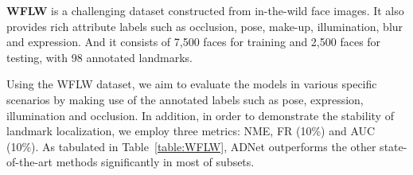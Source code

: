 \documentclass[10pt,twocolumn,letterpaper]{article}
\begin{document}
\vspace{5pt}
\noindent\textbf{WFLW} \cite{wu2018look} is a challenging dataset constructed from in-the-wild face images. It also provides rich attribute labels such as occlusion, pose, make-up, illumination, blur and expression. And it consists of 7,500 faces for training and 2,500 faces for testing, with 98 annotated landmarks.

Using the WFLW dataset, we aim to evaluate the models in various specific scenarios by making use of the annotated labels such as pose, expression, illumination and occlusion. In addition, in order to demonstrate the stability of landmark localization, we employ three metrics: NME, FR (10\%) and AUC (10\%).
As tabulated in Table~\ref{table:WFLW}, ADNet outperforms the other state-of-the-art methods significantly in most of subsets.
\end{document}
